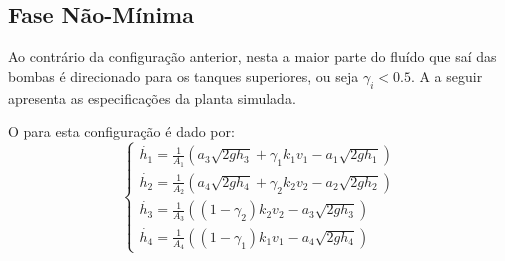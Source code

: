 \subsection{Fase Não-Mínima}
Ao contrário da configuração anterior, nesta a maior parte do fluído que saí das bombas é direcionado  para os tanques superiores, ou seja $\gamma_i < 0.5$. A  a seguir apresenta as especificações da planta simulada.

\begin{table}[!ht]
	\label{tabFaseNM}
	\caption{Parâmetros da planta em fase não-mínima}
	\small
	\centering
\end{table}

O  para esta configuração é dado por:
\begin{equation}
\begin{cases}
\dot{h_{1}} = \frac{1}{A_{1}}(a_{3}\sqrt{2gh_{3}} + \gamma_{1}k_{1}v_{1} - a_{1}\sqrt{2gh_{1}})\\

\dot{h_{2}} = \frac{1}{A_{2}}(a_{4}\sqrt{2gh_{4}} + \gamma_{2}k_{2}v_{2} - a_{2}\sqrt{2gh_{2}})\\

\dot{h_{3}} = \frac{1}{A_{3}}((1 - \gamma_{2})k_{2}v_{2} - a_{3}\sqrt{2gh_{3}})\\

\dot{h_{4}} = \frac{1}{A_{4}}((1 - \gamma_{1})k_{1}v_{1} - a_{4}\sqrt{2gh_{4}})
\end{cases}
\label{eqFNMNL}
\end{equation}

